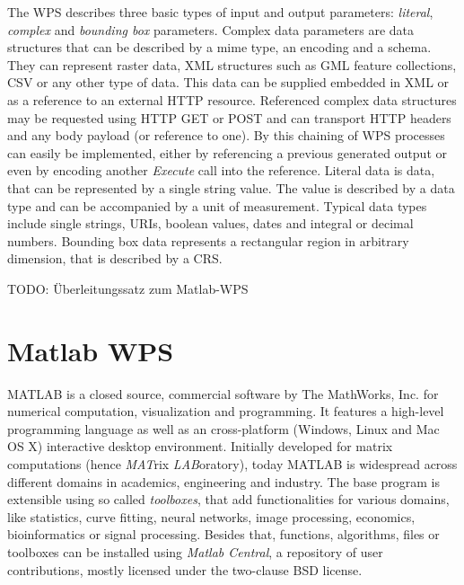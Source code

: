 	The \ac{WPS} describes three basic types of input and output parameters: \emph{literal}, \emph{complex} and \emph{bounding box} parameters. Complex data parameters are data structures that can be described by a mime type, an encoding and a schema. They can represent raster data, XML structures such as GML feature collections, CSV or any other type of data. This data can be supplied embedded in XML or as a reference to an external HTTP resource. Referenced complex data structures may be requested using HTTP GET or POST and can transport HTTP headers and any body payload (or reference to one). By this chaining of \ac{WPS} processes can easily be implemented, either by referencing a previous generated output or even by encoding another \emph{Execute} call into the reference. Literal data is data, that can be represented by a single string value. The value is described by a data type and can be accompanied by a unit of measurement. Typical data types include single strings, URIs, boolean values, dates and integral or decimal numbers. Bounding box data represents a rectangular region in arbitrary dimension, that is described by a \ac{CRS}.

	TODO: Überleitungssatz zum Matlab-WPS
\chapter{Matlab WPS}
	MATLAB is a closed source, commercial software by The MathWorks, Inc. for numerical computation, visualization and programming. It features a high-level programming language as well as an cross-platform (Windows, Linux and Mac OS X) interactive desktop environment. Initially developed for matrix computations (hence \emph{MAT}rix \emph{LAB}oratory), today MATLAB is widespread across different domains in academics, engineering and industry. The base program is extensible using so called \emph{toolboxes}, that add functionalities for various domains, like statistics, curve fitting, neural networks, image processing, economics, bioinformatics or signal processing. Besides that, functions, algorithms, files or toolboxes can be installed using \emph{Matlab Central}, a repository of user contributions, mostly licensed under the two-clause BSD license.

